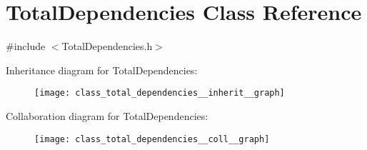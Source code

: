 \hypertarget{class_total_dependencies}{}\section{Total\+Dependencies Class Reference}
\label{class_total_dependencies}


{\ttfamily \#include $<$Total\+Dependencies.\+h$>$}



Inheritance diagram for Total\+Dependencies\+:\nopagebreak
\begin{figure}[H]
\begin{center}
\leavevmode
\texttt{[image: class\_total\_dependencies\_\_inherit\_\_graph]}
\end{center}
\end{figure}


Collaboration diagram for Total\+Dependencies\+:\nopagebreak
\begin{figure}[H]
\begin{center}
\leavevmode
\texttt{[image: class\_total\_dependencies\_\_coll\_\_graph]}
\end{center}
\end{figure}
